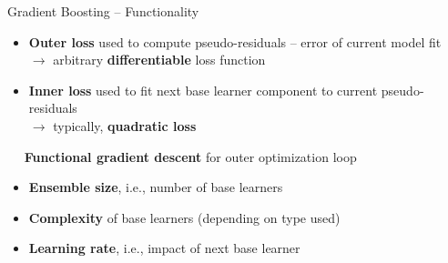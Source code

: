 \begin{frame}{Gradient Boosting -- Functionality}

\footnotesize


\begin{itemize}
  \item \textbf{Outer loss} used to compute pseudo-residuals -- error of 
  current model fit \\
  $\rightarrow$ arbitrary \textbf{differentiable} loss function
  \item \textbf{Inner loss} used to fit next base learner component to 
  current pseudo-residuals \\
  $\rightarrow$ typically, \textbf{quadratic loss}
\end{itemize}

\medskip

 ~~ \textbf{Functional gradient descent} for outer 
optimization loop

\medskip


\begin{itemize}
  \item \textbf{Ensemble size}, i.e., number of base learners
  \item \textbf{Complexity} of base learners (depending on type used)
  \item \textbf{Learning rate}, i.e., impact of next base learner
\end{itemize}

\medskip


\end{frame}


